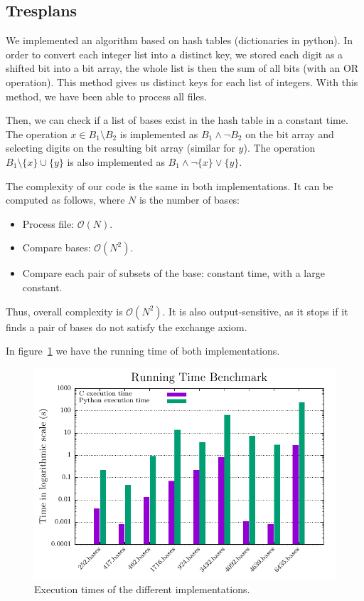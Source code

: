 \documentclass[11pt]{amsart}
\begin{document}
\subsection{Tresplans}

We implemented an algorithm based on hash tables (dictionaries in python).
In order to convert each integer list into a distinct key,
we stored each digit as a shifted bit into a bit array,
the whole list is then the sum of all bits (with an OR operation).
This method gives us distinct keys for each list of integers.
With this method,
we have been able to process all files.

Then, we can check if a list of bases exist in the hash table in a constant time.
The operation
\(x \in B_1 \setminus B_2\)
is implemented as
\(B_1 \land \neg B_2\)
on the bit array and selecting digits on the resulting bit array
(similar for \(y\)).
The operation
\(B_1 \setminus \{x\} \cup \{y\}\)
is also implemented as
\(B_1 \land \neg \{x\} \lor \{y\}\).

The complexity of our code is the same in both implementations.
It can be computed as follows, where $N$ is the number of bases:

\begin{itemize}
 \item Process file: $\mathcal{O}(N)$.
 \item Compare bases: $\mathcal{O}(N^2)$.
 \item Compare each pair of subsets of the base:
       constant time, with a large constant.
\end{itemize}

Thus, overall complexity is $\mathcal{O}(N^2)$.
It is also output-sensitive,
as it stops if it finds a pair of bases do not satisfy the exchange axiom.

In figure~\ref{fig:Tresplans} we have the running time of both implementations.

\begin{figure}[h!]
    \centering
    \includegraphics[width=.75\textwidth]{./Tresplans/Tresplans_exec_time.pdf}
    \caption{Execution times of the different implementations.
    \label{fig:Tresplans}}
\end{figure}
\end{document}
